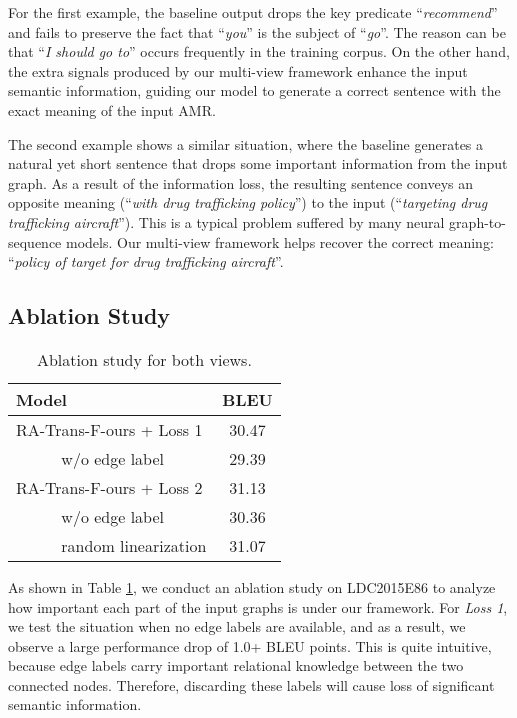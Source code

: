 \documentclass[11pt,a4paper]{article}
\begin{document}
For the first example, the baseline output drops the key predicate ``\emph{recommend}'' and fails to preserve the fact that ``\emph{you}'' is the subject of ``\emph{go}''.
The reason can be that ``\emph{I should go to}'' 
occurs frequently
in the training corpus.
On the other hand, the extra signals produced by our multi-view framework enhance the input semantic information, guiding our model to generate a correct sentence with the exact meaning of the input AMR.


The second example shows a similar situation, where the baseline generates a natural yet short sentence that drops some important information from the input graph.
As a result of the information loss, the resulting sentence conveys an opposite meaning (``\emph{with drug trafficking policy}'') to the input (``\emph{targeting drug trafficking aircraft}'').
This is a typical problem suffered by many neural graph-to-sequence models.
Our multi-view framework helps recover the correct meaning: ``\emph{policy of target for drug trafficking aircraft}''.


\subsection{Ablation Study}


\begin{table}
    \centering
    \begin{tabular}{lc}
    \toprule
    Model & BLEU \\
    \midrule
    RA-Trans-F-ours + Loss 1 & 30.47 \\
    ~~~~~ w/o edge label & 29.39 \\
    \hdashline
    RA-Trans-F-ours + Loss 2 & 31.13 \\
    ~~~~~ w/o edge label & 30.36 \\
    ~~~~~ random linearization & 31.07 \\
    \bottomrule
    \end{tabular}
    \caption{Ablation study for both views.}
    \label{tab:ablation_linear}
    \vspace{-1.0em}
\end{table}


As shown in Table \ref{tab:ablation_linear}, we conduct an ablation study on LDC2015E86 to analyze how important each part of the input graphs is under our framework.
For \emph{Loss 1}, we test the situation when no edge labels are available, and as a result, we observe a large performance drop of 1.0+ BLEU points.
This is quite intuitive, because edge labels carry important relational knowledge between the two connected nodes.
Therefore, discarding these labels will cause loss of significant semantic information.
\end{document}
